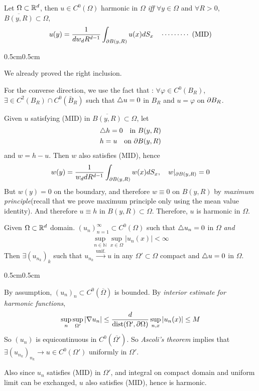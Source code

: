 \documentclass[12pt,a4paper]{article}
\newenvironment{proof}
{\begin{changemargin}{0.5cm}{0.5cm} 
	}%
	{\end{changemargin}
}
\newenvironment{p}
{\begin{proof} 
	}%
	{\end{proof}
}
\begin{document}
 Let $\Omega \subset \mathbb{R}^d$, then $u\in C^0(\Omega)$ harmonic in $\Omega$ \emph{iff} $\forall y\in \Omega$ and $\forall R>0$, $\overline{B(y, R)}\subset \Omega$,
\begin{align*}
u(y) = \frac{1}{dw_d R^{d-1}} \int_{\partial B(y, R)}u(x) dS_x \quad \cdots\cdots\cdots\,\,(\text{MID})
\end{align*}
\begin{p}
\pf We already proved the right inclusion.
\s

For the converse direction, we use the fact that : $\forall \varphi \in C^0(B_R)$, $\exists \in C^2(B_R) \cap C^0(\bar{B}_R)$ such that $\triangle u =0$ in $B_R$ and $u= \varphi$ on $\partial B_R$.

\quad Given $u$ satisfying (MID) in $\overline{B(y, R)}\subset \Omega$, let
\begin{align*}
&\triangle h =0 \quad \text{in }B(y, R)\\
& h = u \quad \text{on } \partial B(y, R)
\end{align*}
and $w = h- u$. Then $w$ also satisfies (MID), hence
\begin{align*}
w(y) = \frac{1}{w_d d R^{d-1}} \int_{\partial B(y,R) }w(x)dS_x, \quad w|_{\partial B(y, R)}=0
\end{align*}
But $w(y) = 0$ on the boundary, and therefore $w\equiv 0$ on $B(y,R)$ by \emph{maximum principle}(recall that we prove maximum principle only using the mean value identity). And therefore $u\equiv h$ in $B(y, R) \subset \Omega$. Therefore, $u$ is harmonic in $\Omega$.

\eop
\end{p}
\s

 Given $\Omega \subset \mathbb{R}^d$ domain. $(u_n)_{n=1}^{\infty} \subset C^0(\Omega)$ such that $\triangle u_n =0$ in $\Omega$ \emph{and}
\begin{align*}
\sup_{n\in \mathbb{N}} \sup_{x\in \Omega} |u_n(x)| < \infty
\end{align*}
Then $\exists (u_{n_k})_k$ such that $u_{n_k} \xrightarrow{\text{unif.}} u$ in any $\Omega' \subset \Omega$ compact and $\triangle u=0$ in $\Omega$.
\begin{p}
\pf By assumption, $(u_n)_n \subset C^0(\overline{\Omega})$ is bounded. By \emph{interior estimate for harmonic functions},
\begin{align*}
\sup_n \sup_{\Omega '} |\nabla u_n| \leq \frac{d}{\text{dist}(\Omega', \partial \Omega)} \sup_{n,x} |u_n(x)| \leq M
\end{align*} 
So $(u_n)$ is equicontinuous in $C^0(\overline{\Omega'})$. So \emph{Ascoli's theorem} implies that $\exists (u_{n_k})_{n_k} \rightarrow u \in C^0(\Omega')$ uniformly in $\Omega'$.

\quad Also since $u_n$ satisfies (MID) in $\Omega'$, and integral on compact domain and uniform limit can be exchanged, $u$ also satisfies (MID), hence is harmonic.

\eop 
\end{p}
\s
\end{document}
